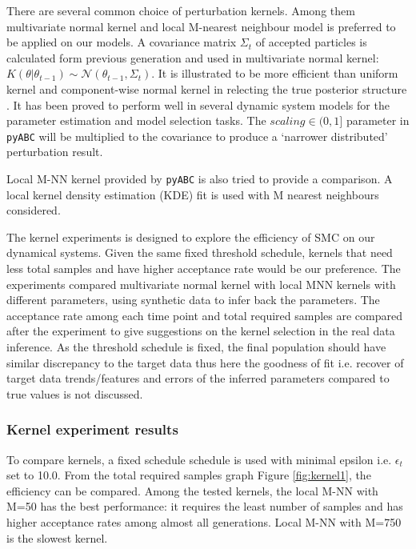 \documentclass[12pt,a4paper]{report}
\begin{document}
There are several common choice of perturbation kernels. Among them multivariate normal kernel and local M-nearest neighbour model is preferred to be applied on our models. A covariance matrix $\Sigma_t$ of accepted particles is calculated form previous generation and used in multivariate normal kernel: $K(\theta|\theta_{t-1})\sim\mathcal{N}(\theta_{t-1}, \Sigma_t)$. It is illustrated to be more efficient than uniform kernel and component-wise normal kernel in relecting the true posterior structure \cite{ref:kernel}. It has been proved to perform well in several dynamic system models \cite{ref:abcsysbio, ref:compare, ref:disease} for the parameter estimation and model selection tasks. The $scaling\in(0,1]$ parameter in \verb|pyABC| will be multiplied to the covariance to produce a `narrower distributed' perturbation result.

Local M-NN kernel provided by \verb|pyABC| is also tried to provide a comparison. A local kernel density estimation (KDE) fit is used with M nearest neighbours considered.

The kernel experiments is designed to explore the efficiency of SMC on our dynamical systems. Given the same fixed threshold schedule, kernels that need less total samples and have higher acceptance rate would be our preference. The experiments compared multivariate normal kernel with local MNN kernels with different parameters, using synthetic data to infer back the parameters. The acceptance rate among each time point and total required samples are compared after the experiment to give suggestions on the kernel selection in the real data inference. As the threshold schedule is fixed, the final population should have similar discrepancy to the target data thus here the goodness of fit i.e. recover of target data trends/features and errors of the inferred parameters compared to true values is not discussed.

\subsubsection{Kernel experiment results}

To compare kernels, a fixed schedule schedule is used with minimal epsilon i.e. $\epsilon_t$ set to 10.0. From the total required samples graph Figure \ref{fig:kernel1}, the efficiency can be compared. Among the tested kernels, the local M-NN with M=50 has the best performance: it requires the least number of samples and 
has higher acceptance rates among almost all generations. Local M-NN with M=750 is the slowest kernel.
\end{document}
